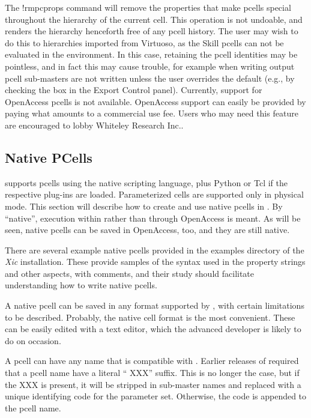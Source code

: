 The {\cb !rmpcprops} command will remove the properties that make
pcells special throughout the hierarchy of the current cell.  This
operation is not undoable, and renders the hierarchy henceforth free
of any pcell history.  The user may wish to do this to hierarchies
imported from Virtuoso, as the Skill pcells can not be evaluated in
the {\Xic} environment.  In this case, retaining the pcell identities
may be pointless, and in fact this may cause trouble, for example when
writing output pcell sub-masters are not written unless the user
overrides the default (e.g., by checking the box in the {\cb Export
Control} panel).
\else
Currently, support for OpenAccess pcells is not available.  OpenAccess
support can easily be provided by paying what amounts to a commercial
use fee.  Users who may need this feature are encouraged to lobby
Whiteley Research Inc..
\fi

\subsection{{\Xic} Native PCells}
\label{pcnative}

{\Xic} supports pcells using the native scripting language, plus
Python or Tcl if the respective plug-ins are loaded.  Parameterized
cells are supported only in physical mode.  This section will describe
how to create and use native pcells in {\Xic}.
\ifoa
By ``native'', execution within {\Xic} rather than through OpenAccess
is meant.  As will be seen, native pcells can be saved in OpenAccess,
too, and they are still native.
\fi

There are several example native pcells provided in the examples
directory of the {\it Xic} installation.  These provide samples of the
syntax used in the property strings and other aspects, with comments,
and their study should facilitate understanding how to write native
pcells.

A native pcell can be saved in any format supported by {\Xic}, with
certain limitations to be described.  Probably, the native cell format
is the most convenient.  These can be easily edited with a text
editor, which the advanced developer is likely to do on occasion.

A pcell can have any name that is compatible with {\Xic}.  Earlier
releases of {\Xic} required that a pcell name have a literal ``{\vt
XXX}'' suffix.  This is no longer the case, but if the {\vt XXX} is
present, it will be stripped in sub-master names and replaced with a
unique identifying code for the parameter set.  Otherwise, the code is
appended to the pcell name.

